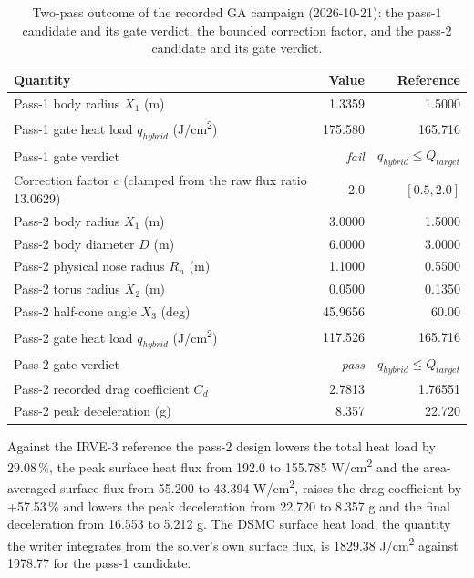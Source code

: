 \begin{table}[htbp]
    \centering
    \caption{Two-pass outcome of the recorded GA campaign (2026-10-21): the pass-1 candidate and its
    gate verdict, the bounded correction factor, and the pass-2 candidate and its gate verdict.}
    \label{tab:ga_two_pass}
    \begin{tabularx}{\textwidth}{Xrr}
        \toprule
        \textbf{Quantity} & \textbf{Value} & \textbf{Reference} \\
        \midrule
        Pass-1 body radius $X_1$ (m) & 1.3359 & 1.5000 \\
        Pass-1 gate heat load $q_{hybrid}$ (J/cm\textsuperscript{2}) & 175.580 & 165.716 \\
        Pass-1 gate verdict & \emph{fail} & $q_{hybrid} \leq Q_{target}$ \\
        Correction factor $c$ (clamped from the raw flux ratio 13.0629) & 2.0 & $[0.5, 2.0]$ \\
        Pass-2 body radius $X_1$ (m) & 3.0000 & 1.5000 \\
        Pass-2 body diameter $D$ (m) & 6.0000 & 3.0000 \\
        Pass-2 physical nose radius $R_n$ (m) & 1.1000 & 0.5500 \\
        Pass-2 torus radius $X_2$ (m) & 0.0500 & 0.1350 \\
        Pass-2 half-cone angle $X_3$ (deg) & 45.9656 & 60.00 \\
        Pass-2 gate heat load $q_{hybrid}$ (J/cm\textsuperscript{2}) & 117.526 & 165.716 \\
        Pass-2 gate verdict & \emph{pass} & $q_{hybrid} \leq Q_{target}$ \\
        Pass-2 recorded drag coefficient $C_d$ & 2.7813 & 1.76551 \\
        Pass-2 peak deceleration (g) & 8.357 & 22.720 \\
        \bottomrule
    \end{tabularx}
\end{table}

Against the IRVE-3 reference the pass-2 design lowers the total heat load by $29.08\,\%$, the
peak surface heat flux from 192.0 to 155.785 W/cm\textsuperscript{2} and the area-averaged
surface flux from 55.200 to 43.394 W/cm\textsuperscript{2}, raises the drag coefficient by
+57.53\,\% and lowers the peak deceleration from 22.720 to 8.357 g and the final
deceleration from 16.553 to 5.212 g. The DSMC surface heat load, the quantity the writer
integrates from the solver's own surface flux, is 1829.38 J/cm\textsuperscript{2} against
1978.77 for the pass-1 candidate.


